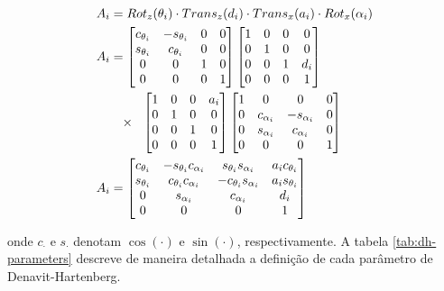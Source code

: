 \begin{align}
    A_i &= Rot_z(\theta_i) \cdot Trans_z(d_i) \cdot Trans_x(a_i) \cdot Rot_x(\alpha_i) \\
    A_i &= \begin{bmatrix}
        c_{\theta_i} & -s_{\theta_i} & 0 & 0 \\
        s_{\theta_i} &  c_{\theta_i} & 0 & 0 \\
        0 & 0 & 1 & 0 \\
        0 & 0 & 0 & 1
    \end{bmatrix} \begin{bmatrix}
        1 & 0 & 0 & 0 \\
        0 & 1 & 0 & 0 \\
        0 & 0 & 1 & d_i \\
        0 & 0 & 0 & 1
    \end{bmatrix} \notag \\
    &\phantom{=} \times \ \ \begin{bmatrix}
        1 & 0 & 0 & a_i \\
        0 & 1 & 0 & 0 \\
        0 & 0 & 1 & 0 \\
        0 & 0 & 0 & 1
    \end{bmatrix} \begin{bmatrix}
        1 & 0 & 0 & 0 \\
        0 & c_{\alpha_i} & -s_{\alpha_i} & 0 \\
        0 & s_{\alpha_i} &  c_{\alpha_i} & 0 \\
        0 & 0 & 0 & 1
    \end{bmatrix} \notag \\
    A_i &= \begin{bmatrix}
        c_{\theta_i} & -s_{\theta_i}c_{\alpha_i} & s_{\theta_i}s_{\alpha_i} & a_i c_{\theta_i} \\
        s_{\theta_i} & c_{\theta_i}c_{\alpha_i} & -c_{\theta_i}s_{\alpha_i} & a_i s_{\theta_i} \\
        0 & s_{\alpha_i} & c_{\alpha_i} & d_i \\
        0 & 0 & 0 & 1
    \end{bmatrix} \label{eq:dh-matrix}
\end{align}

onde $c_{\cdot}$ e $s_{\cdot}$ denotam $\cos(\cdot)$ e $\sin(\cdot)$, respectivamente. A tabela \ref{tab:dh-parameters} descreve de maneira detalhada a definição de cada parâmetro de Denavit-Hartenberg.

